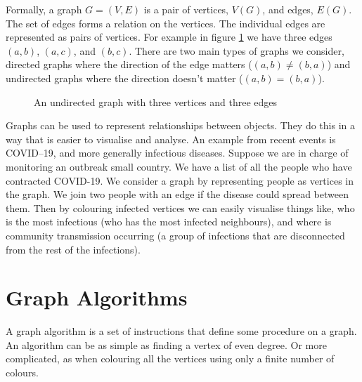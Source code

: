 Formally, a graph $G=(V,E)$ is a pair of vertices, $V(G)$, and edges, $E(G)$. The set of edges forms a relation on the vertices. The individual edges are represented as pairs of vertices. For example in figure \ref{fig:k3} we have three edges $(a,b)$, $(a,c)$, and $(b,c)$. There are two main types of graphs we consider, directed graphs where the direction of the edge matters ($(a,b)\neq (b,a)$) and undirected graphs where the direction doesn't matter ($(a,b)=(b,a)$). 

\begin{figure}[h]
    \centering
{}
    \caption{An undirected graph with three vertices and three edges}
\label{fig:k3}
\end{figure}
   
Graphs can be used to represent relationships between objects. They do this in a way that is easier to visualise and analyse. An example from recent events is COVID--19, and more generally infectious diseases.  Suppose we are in charge of monitoring an outbreak small country. We have a list of all the people who have contracted COVID-19. We consider a graph by representing people as vertices in the graph. We join two people with an edge if the disease could spread between them.
Then by colouring infected vertices we can easily visualise things like, who is the most infectious (who has the most infected neighbours), and where is community transmission occurring (a group of infections that are disconnected from the rest of the infections).
  
\section{Graph Algorithms}
A graph algorithm is a set of instructions that define some procedure on a graph. An algorithm can be as simple as finding a vertex of even degree. Or more complicated, as when colouring all the vertices using only a finite number of colours.  

